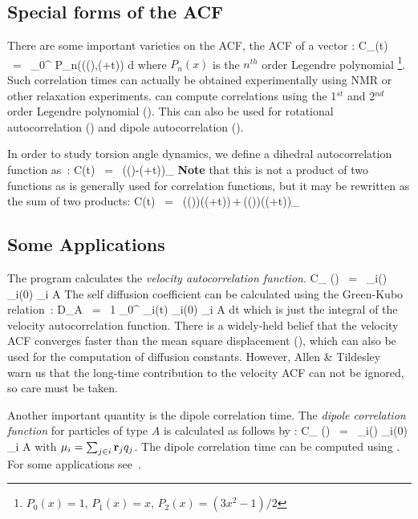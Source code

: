 \subsection{Special forms of the ACF}
There are some important varieties on the ACF, {\eg} the ACF of a vector :
\beq
C_{}(t) ~=~       \int_0^{\infty} P_n(\cos\angle\left((\xi),(\xi+t)\right) {\rm d} \xi
\label{eqn:corrleg}
\eeq
where $P_n(x)$ is the $n^{th}$ order Legendre polynomial
\footnote{$P_0(x) = 1$, $P_1(x) = x$, $P_2(x) = (3x^2-1)/2$}.
Such correlation times 
can actually be obtained experimentally using {\eg} NMR or other relaxation 
experiments. {\gromacs} can compute correlations using 
the 1$^{st}$ and 2$^{nd}$ order Legendre polynomial ().
This can also be used for rotational autocorrelation
({\tt {}})
and dipole autocorrelation ({\tt {}}).

In order to study torsion angle dynamics, we define a dihedral 
autocorrelation function as~\cite{Spoel97a}:
\beq
C(t)    ~=~     \left\langle \cos(\theta(\tau)-\theta(\tau+t))\right\rangle_{\tau}
\label{eqn:coenk}
\eeq
{\bf Note} that this is not a  product of two functions 
as is generally used for correlation
functions, but it may be rewritten as the sum of two products:
\beq
C(t)    ~=~     \left\langle\cos(\theta(\tau))\cos(\theta(\tau+t))\,+\,\sin(\theta(\tau))\sin(\theta(\tau+t))\right\rangle_{\tau}
\label{eqn:cot}
\eeq

\subsection{Some Applications}
The program {\tt {}} calculates the {\em velocity autocorrelation 
function}.
\beq
C_{} (\tau) ~=~ _i(\tau) _i(0) \rangle_{i \in A}
\eeq
The self diffusion coefficient can be calculated using the Green-Kubo 
relation~\cite{Allen87}:
\beq
D_A ~=~ {1} \int_0^{\infty} _i(t) _i(0) \rangle_{i \in A} \; dt
\eeq
which is just the integral of the velocity autocorrelation function.
There is a widely-held belief that the velocity ACF converges faster than the mean
square displacement (), which can also be used for the computation of 
diffusion constants. However, Allen \& Tildesley~\cite{Allen87} 
warn us that the long-time 
contribution to the velocity ACF can not be ignored, so care must be taken.

Another important quantity is the dipole correlation time. The {\em dipole 
correlation function} for particles of type $A$ is calculated as follows by 
{\tt {}}:
\beq
C_{\mu} (\tau) ~=~
\langle {\bf \mu}_i(\tau) \cdot {\bf \mu}_i(0) \rangle_{i \in A}
\eeq
with ${\bf \mu}_i = \sum_{j \in i} {\bf r}_j q_j$. The dipole correlation time 
can be computed using .
For some applications see~\cite{Spoel98a}.

